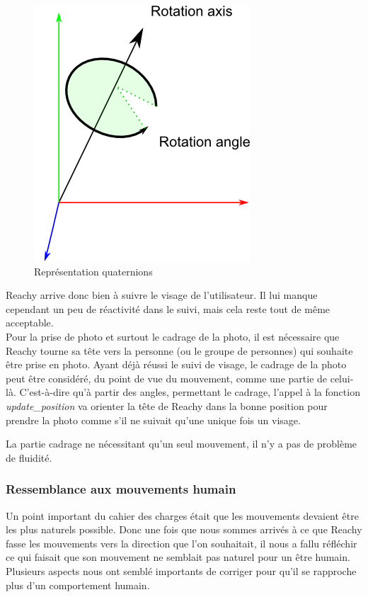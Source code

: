 \documentclass[a4paper,french]{article}
\begin{document}
\begin{figure}[!ht]
    \centering
    \includegraphics[scale = 0.5 ]{figures/quaternion.png}
    \caption{Représentation quaternions}
    \label{fig:quaternion}
\end{figure}

Reachy arrive donc bien à suivre le visage de l'utilisateur. Il lui manque cependant un peu de réactivité dans le suivi, mais cela reste tout de même acceptable.\\

Pour la prise de photo et surtout le cadrage de la photo, il est nécessaire que Reachy tourne sa tête vers la personne (ou le groupe de personnes) qui souhaite être prise en photo. Ayant déjà réussi le suivi de visage, le cadrage de la photo peut être considéré, du point de vue du mouvement, comme une partie de celui-là. C'est-à-dire qu'à partir des angles, permettant le cadrage, l'appel à la fonction \textit{update\_position} va orienter la tête de Reachy dans la bonne position pour prendre la photo comme s'il ne suivait qu'une unique fois un visage.

La partie cadrage ne nécessitant qu'un seul mouvement, il n'y a pas de problème de fluidité.

\subsubsection{Ressemblance aux mouvements humain}
Un point important du cahier des charges était que les mouvements devaient être les plus naturels possible. Donc une fois que nous sommes arrivés à ce que Reachy fasse les mouvements vers la direction que l'on souhaitait, il nous a fallu réfléchir ce qui faisait que son mouvement ne semblait pas naturel pour un être humain. Plusieurs aspects nous ont semblé importants de corriger pour qu'il se rapproche plus d'un comportement humain.\\
\end{document}
